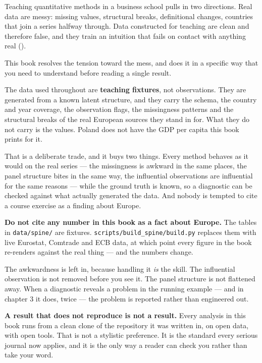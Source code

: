 \documentclass[
  letterpaper,
  10pt,
  twoside,
  openright,
  numbers=noenddot,
  chapterprefix=true]{scrbook}
\begin{document}
Teaching quantitative methods in a business school pulls in two
directions. Real data are messy: missing values, structural breaks,
definitional changes, countries that join a series halfway through. Data
constructed for teaching are clean and therefore false, and they train
an intuition that fails on contact with anything real
().

This book resolves the tension toward the mess, and does it in a
specific way that you need to understand before reading a single result.

The data used throughout are \textbf{teaching fixtures}, not
observations. They are generated from a known latent structure, and they
carry the schema, the country and year coverage, the observation flags,
the missingness patterns and the structural breaks of the real European
sources they stand in for. What they do not carry is the values. Poland
does not have the GDP per capita this book prints for it.

That is a deliberate trade, and it buys two things. Every method behaves
as it would on the real series --- the missingness is awkward in the
same places, the panel structure bites in the same way, the influential
observations are influential for the same reasons --- while the ground
truth is known, so a diagnostic can be checked against what actually
generated the data. And nobody is tempted to cite a course exercise as a
finding about Europe.

\begin{qmibwarn}

\textbf{Do not cite any number in this book as a fact about Europe.} The
tables in \texttt{data/spine/} are fixtures.
\texttt{scripts/build\_spine/build.py} replaces them with live Eurostat,
Comtrade and ECB data, at which point every figure in the book
re-renders against the real thing --- and the numbers change.

\end{qmibwarn}

The awkwardness is left in, because handling it \emph{is} the skill. The
influential observation is not removed before you see it. The panel
structure is not flattened away. When a diagnostic reveals a problem in
the running example --- and in chapter 3 it does, twice --- the problem
is reported rather than engineered out.

\begin{qmibstep}

\textbf{A result that does not reproduce is not a result.} Every
analysis in this book runs from a clean clone of the repository it was
written in, on open data, with open tools. That is not a stylistic
preference. It is the standard every serious journal now applies, and it
is the only way a reader can check you rather than take your word.

\end{qmibstep}
\end{document}
